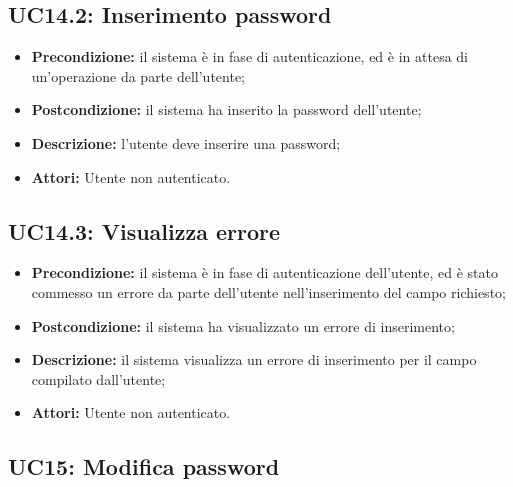 \subsection{ UC14.2: Inserimento password}

\begin{itemize}
	\item \textbf{Precondizione:} il sistema è in fase di autenticazione, ed è in attesa di un'operazione da parte dell'utente;
	\item \textbf{Postcondizione:} il sistema ha inserito la password dell'utente;
	\item \textbf{Descrizione:} l'utente deve inserire una password;
	\item \textbf{Attori:} Utente non autenticato.
\end{itemize}
\subsection{ UC14.3: Visualizza errore}

\begin{itemize}
	\item \textbf{Precondizione:} il sistema è in fase di autenticazione dell'utente, ed è stato commesso un errore da parte dell'utente nell'inserimento del campo richiesto;
	\item \textbf{Postcondizione:} il sistema ha visualizzato un errore di inserimento;
	\item \textbf{Descrizione:} il sistema visualizza un errore di inserimento per il campo compilato dall'utente;
	\item \textbf{Attori:} Utente non autenticato.
\end{itemize}
\subsection{ UC15: Modifica password}


